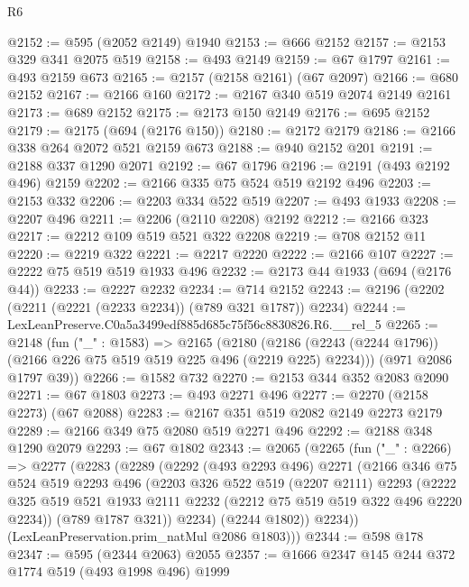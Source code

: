 \begin{lexlean}{R6}
\begin{coremodule}
@2152 := @595 (@2052 @2149) @1940
@2153 := @666 @2152
@2157 := @2153 @329 @341 @2075 @519
@2158 := @493 @2149
@2159 := @67 @1797
@2161 := @493 @2159 @673
@2165 := @2157 (@2158 @2161) (@67 @2097)
@2166 := @680 @2152
@2167 := @2166 @160
@2172 := @2167 @340 @519 @2074 @2149 @2161
@2173 := @689 @2152
@2175 := @2173 @150 @2149
@2176 := @695 @2152
@2179 := @2175 (@694 (@2176 @150))
@2180 := @2172 @2179
@2186 := @2166 @338 @264 @2072 @521 @2159 @673
@2188 := @940 @2152 @201
@2191 := @2188 @337 @1290 @2071
@2192 := @67 @1796
@2196 := @2191 (@493 @2192 @496) @2159
@2202 := @2166 @335 @75 @524 @519 @2192 @496
@2203 := @2153 @332
@2206 := @2203 @334 @522 @519
@2207 := @493 @1933
@2208 := @2207 @496
@2211 := @2206 (@2110 @2208) @2192
@2212 := @2166 @323
@2217 := @2212 @109 @519 @521 @322 @2208
@2219 := @708 @2152 @11
@2220 := @2219 @322
@2221 := @2217 @2220
@2222 := @2166 @107
@2227 := @2222 @75 @519 @519 @1933 @496
@2232 := @2173 @44 @1933 (@694 (@2176 @44))
@2233 := @2227 @2232
@2234 := @714 @2152
@2243 := @2196 (@2202 (@2211 (@2221 (@2233 @2234)) (@789 @321 @1787)) @2234)
@2244 := LexLeanPreserve.C0a5a3499edf885d685c75f56c8830826.R6.__rel_5
@2265 := @2148
    (fun ("_" : @1583) =>
    @2165
      (@2180 (@2186 (@2243 (@2244 @1796)) (@2166 @226 @75 @519 @519 @225 @496 (@2219 @225) @2234)))
      (@971 @2086 @1797 @39))
@2266 := @1582 @732
@2270 := @2153 @344 @352 @2083 @2090
@2271 := @67 @1803
@2273 := @493 @2271 @496
@2277 := @2270 (@2158 @2273) (@67 @2088)
@2283 := @2167 @351 @519 @2082 @2149 @2273 @2179
@2289 := @2166 @349 @75 @2080 @519 @2271 @496
@2292 := @2188 @348 @1290 @2079
@2293 := @67 @1802
@2343 := @2065
    (@2265
      (fun ("_" : @2266) =>
      @2277
        (@2283
          (@2289
            (@2292
              (@493 @2293 @496)
              @2271
              (@2166
                @346
                @75
                @524
                @519
                @2293
                @496
                (@2203
                  @326
                  @522
                  @519
                  (@2207 @2111)
                  @2293
                  (@2222
                    @325
                    @519
                    @521
                    @1933
                    @2111
                    @2232
                    (@2212 @75 @519 @519 @322 @496 @2220 @2234))
                  (@789 @1787 @321))
                @2234)
              (@2244 @1802))
            @2234))
        (LexLeanPreservation.prim_natMul @2086 @1803)))
@2344 := @598 @178
@2347 := @595 (@2344 @2063) @2055
@2357 := @1666 @2347 @145 @244 @372 @1774 @519 (@493 @1998 @496) @1999

\end{coremodule}
\end{lexlean}

